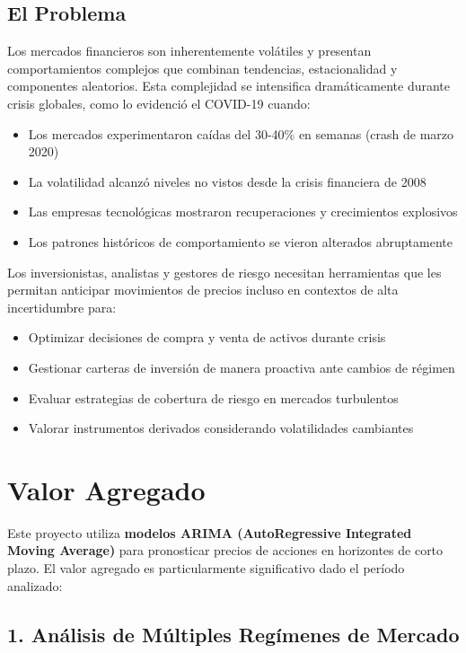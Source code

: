 \documentclass[
]{book}
\providecommand{\tightlist}{%
  \setlength{\itemsep}{0pt}\setlength{\parskip}{0pt}}
\begin{document}
\subsection{El Problema}\label{el-problema}

Los mercados financieros son inherentemente volátiles y presentan comportamientos complejos que combinan tendencias, estacionalidad y componentes aleatorios. Esta complejidad se intensifica dramáticamente durante crisis globales, como lo evidenció el COVID-19 cuando:

\begin{itemize}
\tightlist
\item
  Los mercados experimentaron caídas del 30-40\% en semanas (crash de marzo 2020)
\item
  La volatilidad alcanzó niveles no vistos desde la crisis financiera de 2008
\item
  Las empresas tecnológicas mostraron recuperaciones y crecimientos explosivos
\item
  Los patrones históricos de comportamiento se vieron alterados abruptamente
\end{itemize}

Los inversionistas, analistas y gestores de riesgo necesitan herramientas que les permitan anticipar movimientos de precios incluso en contextos de alta incertidumbre para:

\begin{itemize}
\tightlist
\item
  Optimizar decisiones de compra y venta de activos durante crisis
\item
  Gestionar carteras de inversión de manera proactiva ante cambios de régimen
\item
  Evaluar estrategias de cobertura de riesgo en mercados turbulentos
\item
  Valorar instrumentos derivados considerando volatilidades cambiantes
\end{itemize}

\section{Valor Agregado}\label{valor-agregado}

Este proyecto utiliza \textbf{modelos ARIMA (AutoRegressive Integrated Moving Average)} para pronosticar precios de acciones en horizontes de corto plazo. El valor agregado es particularmente significativo dado el período analizado:

\subsection{1. Análisis de Múltiples Regímenes de Mercado}\label{anuxe1lisis-de-muxfaltiples-reguxedmenes-de-mercado}
\end{document}
